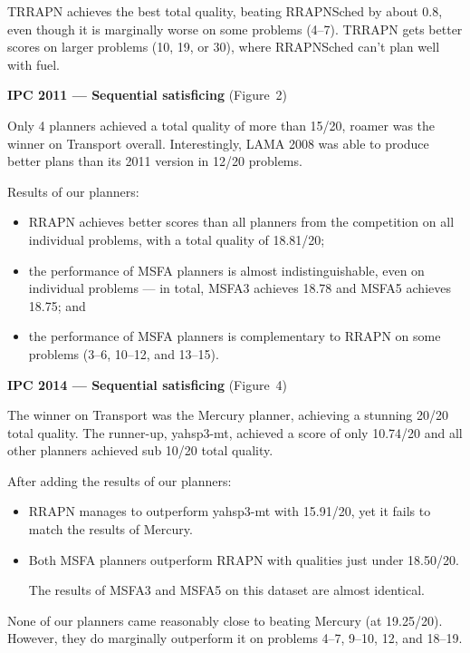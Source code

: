 \documentclass[a0paper,fontscale=0.285]{baposter} %
\begin{document}
\begin{poster}
{\begin{multicols}{3}
TRRAPN achieves the best total quality,
beating RRAPNSched by about 0.8,
even though it is marginally worse on some problems (4--7). TRRAPN gets better scores on
larger problems (10, 19, or 30), where RRAPNSched can't plan well with fuel.


\vspace{0.15cm}
\textbf{IPC 2011 --- Sequential satisficing} (Figure~2)
\vspace{0.15cm}

Only 4 planners achieved a total quality of more than 15/20, roamer was the winner on Transport overall.
Interestingly, LAMA 2008 was able to produce better plans than its 2011 version in 12/20 problems.

Results of our planners:
\begin{itemize}
\item RRAPN achieves better scores than all planners from the competition on all individual problems, with a total quality of 18.81/20;
\item the performance of MSFA planners
is almost indistinguishable, even on individual problems --- in total, MSFA3 achieves 18.78 and MSFA5 achieves 18.75; and
\item the performance of MSFA planners is complementary to RRAPN on some problems (3--6, 10--12, and 13--15).
\end{itemize}

\vspace{0.15cm}
\textbf{IPC 2014 --- Sequential satisficing} (Figure~4)
\vspace{0.15cm}

The winner on Transport was the Mercury planner, achieving
a stunning 20/20 total quality. The runner-up, yahsp3-mt, achieved a score of only 10.74/20
and all other planners achieved sub 10/20 total quality.

After adding the results of our planners:
\begin{itemize}
\item RRAPN manages to outperform yahsp3-mt with 15.91/20, yet it fails
to match the results of Mercury.
\item Both MSFA planners outperform RRAPN with qualities just under 18.50/20.

The results of MSFA3 and MSFA5 on this dataset are almost identical.
\end{itemize}
None of our planners came reasonably close to beating Mercury (at 19.25/20).
However, they do marginally outperform it on problems 4--7, 9--10, 12, and 18--19.
\end{multicols}

}
\end{poster}
\end{document}
